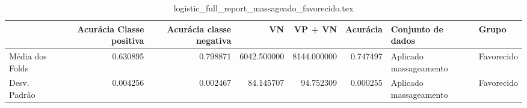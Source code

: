 \begin{table}
\centering
\caption{logistic_full_report_massageado_favorecido.tex}
\label{logistic_full_report_massageado_favorecido.tex}
\begin{tabular}{lrrrrrll}
\toprule
{} &  Acurácia Classe positiva &  Acurácia classe negativa &          VN  &     VP + VN  &  Acurácia &       Conjunto de dados &       Grupo \\
\midrule
Média dos Folds &                  0.630895 &                  0.798871 &  6042.500000 &  8144.000000 &  0.747497 &  Aplicado massageamento &  Favorecido \\
Desv. Padrão    &                  0.004256 &                  0.002467 &    84.145707 &    94.752309 &  0.000255 &  Aplicado massageamento &  Favorecido \\
\bottomrule
\end{tabular}
\end{table}
